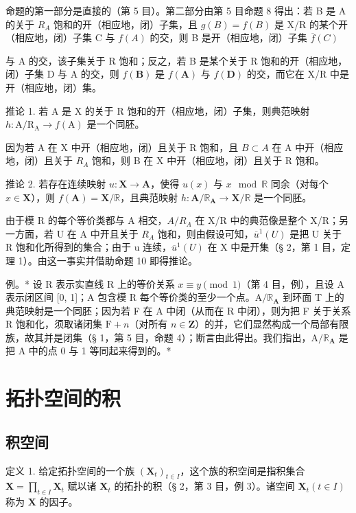 命题的第一部分是直接的（第 5 目）。第二部分由第 5 目命题 8 得出：若 B 是 A 的关于 \(R_{A}\) 饱和的开（相应地，闭）子集，且 \(g(B) = f(B)\) 是 X/R 的某个开（相应地，闭）子集 C 与 \(f(A)\) 的交，则 B 是开（相应地，闭）子集 \(\overline{f}(C)\)

与 A 的交，该子集关于 R 饱和；反之，若 B 是某个关于 R 饱和的开（相应地，闭）子集 D 与 A 的交，则 \(f(\mathbf{B})\) 是 \(f(\mathbf{A})\) 与 \(f(\mathbf{D})\) 的交，而它在 X/R 中是开（相应地，闭）集。

推论 1. 若 A 是 X 的关于 R 饱和的开（相应地，闭）子集，则典范映射 \(h: \mathrm{A}/\mathrm{R}_{\mathrm{A}} \rightarrow f(\mathrm{A})\) 是一个同胚。

因为若 A 在 X 中开（相应地，闭）且关于 R 饱和，且 \(B \subset A\) 在 A 中开（相应地，闭）且关于 \(R_{A}\) 饱和，则 B 在 X 中开（相应地，闭）且关于 R 饱和。

推论 2. 若存在连续映射 \(u: \mathbf{X} \to \mathbf{A}\)，使得 \(u(x)\) 与 \(x \mod \mathbb{R}\) 同余（对每个 \(x \in \mathbf{X}\)），则 \(f(\mathbf{A}) = \mathbf{X} / \mathbb{R}\)，且典范映射 \(h: \mathbf{A} / \mathbb{R}_{\mathbf{A}} \to \mathbf{X} / \mathbb{R}\) 是一个同胚。

由于模 R 的每个等价类都与 A 相交，\(A/R_{A}\) 在 X/R 中的典范像是整个 X/R；另一方面，若 U 在 A 中开且关于 \(R_{A}\) 饱和，则由假设可知，\(\overline{u}^{1}(U)\) 是把 U 关于 R 饱和化所得到的集合；由于 u 连续，\(\overline{u}^{1}(U)\) 在 X 中是开集（§ 2，第 1 目，定理 1）。由这一事实并借助命题 10 即得推论。

例。* 设 R 表示实直线 R 上的等价关系 \(x \equiv y \pmod{1}\)（第 4 目，例），且设 A 表示闭区间 {[}0, 1{]}；A 包含模 R 每个等价类的至少一个点。\(\mathrm{A} / \mathbb{R}_{\mathbf{A}}\) 到环面 T 上的典范映射是一个同胚；因为若 F 在 A 中闭（从而在 R 中闭），则为把 F 关于关系 R 饱和化，须取诸闭集 \(\mathrm{F} + n\)（对所有 \(n \in \mathbf{Z}\)）的并，它们显然构成一个局部有限族，故其并是闭集（§ 1，第 5 目，命题 4）；断言由此得出。我们指出，\(\mathrm{A} / \mathbb{R}_{\mathbf{A}}\) 是把 A 中的点 0 与 1 等同起来得到的。*

\section{拓扑空间的积}

\subsection{积空间}

定义 1. 给定拓扑空间的一个族 \((\mathbf{X}_{t})_{t\in I}\)，这个族的积空间是指积集合 \(\mathbf{X} = \prod_{t\in I}\mathbf{X}_{t}\) 赋以诸 \(\mathbf{X}_{t}\) 的拓扑的积（§ 2，第 3 目，例 3）。诸空间 \(\mathbf{X}_{t}(t\in I)\) 称为 \(\mathbf{X}\) 的因子。

